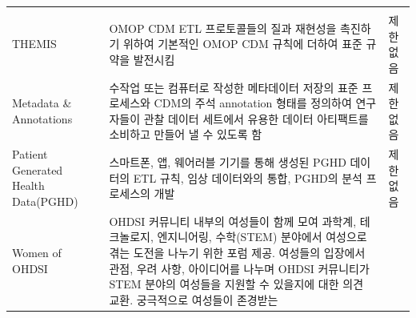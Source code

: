 \documentclass[10.5pt]{book}
\theoremstyle{definition}
\theoremstyle{definition}
\theoremstyle{definition}
\theoremstyle{remark}
\begin{document}
\begin{longtable}[]{@{}lll@{}}
\begin{minipage}[t]{0.37\columnwidth}
\end{minipage}\tabularnewline
\begin{minipage}[t]{0.11\columnwidth}\raggedright\strut
THEMIS\strut
\end{minipage} & \begin{minipage}[t]{0.44\columnwidth}\raggedright\strut
OMOP CDM ETL 프로토콜들의 질과 재현성을 촉진하기 위하여 기본적인 OMOP
CDM 규칙에 더하여 표준 규약을 발전시킴\strut
\end{minipage} & \begin{minipage}[t]{0.37\columnwidth}\raggedright\strut
제한 없음\strut
\end{minipage}\tabularnewline
\begin{minipage}[t]{0.11\columnwidth}\raggedright\strut
Metadata \& Annotations\strut
\end{minipage} & \begin{minipage}[t]{0.44\columnwidth}\raggedright\strut
수작업 또는 컴퓨터로 작성한 메타데이터 저장의 표준 프로세스와 CDM의 주석
annotation 형태를 정의하여 연구자들이 관찰 데이터 세트에서 유용한 데이터
아티팩트를 소비하고 만들어 낼 수 있도록 함\strut
\end{minipage} & \begin{minipage}[t]{0.37\columnwidth}\raggedright\strut
제한 없음\strut
\end{minipage}\tabularnewline
\begin{minipage}[t]{0.11\columnwidth}\raggedright\strut
Patient Generated Health Data(PGHD)\strut
\end{minipage} & \begin{minipage}[t]{0.44\columnwidth}\raggedright\strut
스마트폰, 앱, 웨어러블 기기를 통해 생성된 PGHD 데이터의 ETL 규칙, 임상
데이터와의 통합, PGHD의 분석 프로세스의 개발\strut
\end{minipage} & \begin{minipage}[t]{0.37\columnwidth}\raggedright\strut
제한 없음\strut
\end{minipage}\tabularnewline
\begin{minipage}[t]{0.11\columnwidth}\raggedright\strut
Women of OHDSI\strut
\end{minipage} & \begin{minipage}[t]{0.44\columnwidth}\raggedright\strut
OHDSI 커뮤니티 내부의 여성들이 함께 모여 과학계, 테크놀로지, 엔지니어링,
수학(STEM) 분야에서 여성으로 겪는 도전을 나누기 위한 포럼 제공. 여성들의
입장에서 관점, 우려 사항, 아이디어를 나누며 OHDSI 커뮤니티가 STEM 분야의
여성들을 지원할 수 있을지에 대한 의견 교환. 궁극적으로 여성들이 존경받는

\end{minipage}
\end{longtable}
\end{document}
